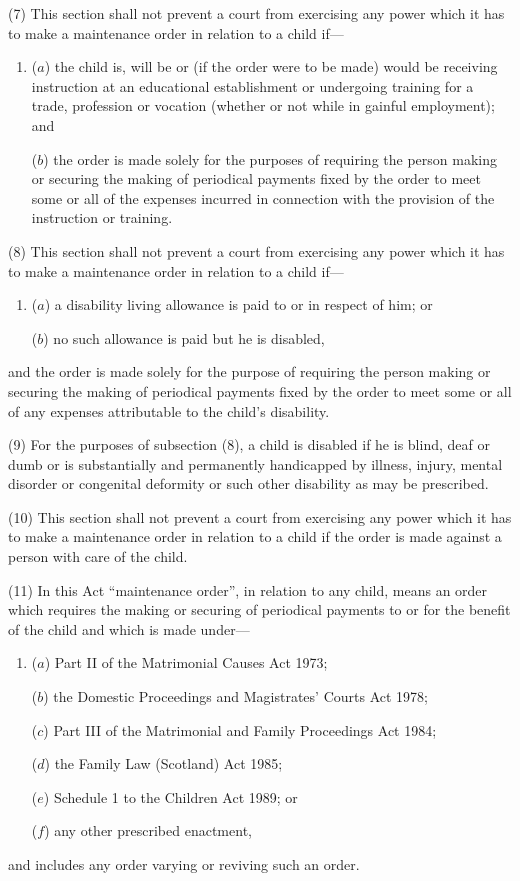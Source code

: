 \documentclass[12pt,a4paper]{article}
\begin{document}
(7) This section shall not prevent a court from exercising any power which it has to make a maintenance order in relation to a child if—
\begin{enumerate}\item[]
($a$) the child is, will be or (if the order were to be made) would be receiving instruction at an educational establishment or undergoing training for a trade, profession or vocation (whether or not while in gainful employment); and

($b$) the order is made solely for the purposes of requiring the person making or securing the making of periodical payments fixed by the order to meet some or all of the expenses incurred in connection with the provision of the instruction or training.
\end{enumerate}

(8) This section shall not prevent a court from exercising any power which it has to make a maintenance order in relation to a child if—
\begin{enumerate}\item[]
($a$) a disability living allowance is paid to or in respect of him; or

($b$) no such allowance is paid but he is disabled,
\end{enumerate}
and the order is made solely for the purpose of requiring the person making or securing the making of periodical payments fixed by the order to meet some or all of any expenses attributable to the child’s disability.

(9) For the purposes of subsection (8), a child is disabled if he is blind, deaf or dumb or is substantially and permanently handicapped by illness, injury, mental disorder or congenital deformity or such other disability as may be prescribed.

(10) This section shall not prevent a court from exercising any power which it has to make a maintenance order in relation to a child if the order is made against a person with care of the child.

(11) In this Act “maintenance order”, in relation to any child, means an order which requires the making or securing of periodical payments to or for the benefit of the child and which is made under—
\begin{enumerate}\item[]
($a$) Part II of the Matrimonial Causes Act 1973;

($b$) the Domestic Proceedings and Magistrates' Courts Act 1978;

($c$) Part III of the Matrimonial and Family Proceedings Act 1984;

($d$) the Family Law (Scotland) Act 1985;

($e$) Schedule 1 to the Children Act 1989; or

($f$) any other prescribed enactment,
\end{enumerate}
and includes any order varying or reviving such an order.
\end{document}
